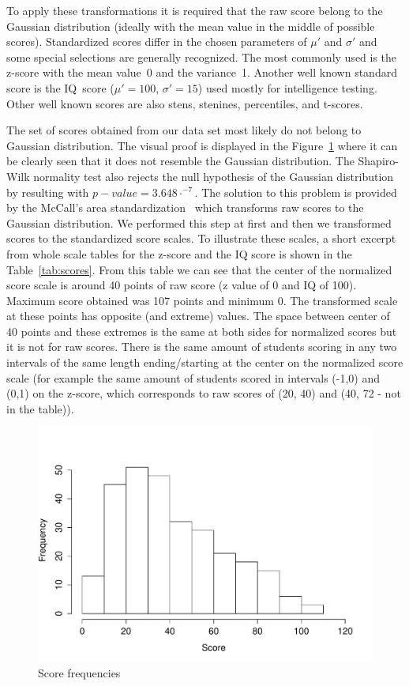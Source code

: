 To apply these transformations it is required that the raw score belong to the Gaussian distribution (ideally with the mean value in the middle of possible scores). Standardized scores differ in the chosen parameters of $\mu'$ and $\sigma'$ and some special selections are generally recognized. The most commonly used is the z-score with the mean value~0 and the variance~1. Another well known standard score is the IQ~score (${\mu' = 100}$, ${\sigma'=15}$) used mostly for intelligence testing. Other well known scores are also stens, stenines, percentiles, and t-scores.

The set of scores obtained from our data set most likely do not belong to Gaussian distribution. The visual proof is displayed in the Figure~\ref{pic:gauss} where it can be clearly seen that it does not resemble the Gaussian distribution. The Shapiro-Wilk normality test also rejects the null hypothesis of the Gaussian distribution by resulting with $p-value = 3.648\cdot^{-7}$. The solution to this problem is provided by the McCall’s area standardization~\cite{McCall2011, 2011psychometrics} which transforms raw scores to the Gaussian distribution. We performed this step at first and then we transformed scores to the standardized score scales. To illustrate these scales, a short excerpt from whole scale tables for the z-score and the IQ score is shown in the Table~\ref{tab:scores}. From this table we can see that the center of the normalized score scale is around 40 points of raw score (z value of 0 and IQ of 100). Maximum score obtained was 107 points and minimum 0. The transformed scale at these points has opposite (and extreme) values. The space between center of 40 points and these extremes is the same at both sides for normalized scores but it is not for raw scores. There is the same amount of students scoring in any two intervals of the same length ending/starting at the center on the normalized score scale (for example the same amount of students scored in intervals (-1,0) and (0,1) on the z-score, which corresponds to raw scores of (20, 40) and (40, 72 - not in the table)).


\begin{figure}%
\begin{center}
\includegraphics[width=0.8\columnwidth]{obr/hist.pdf}%
\caption{Score frequencies}%
\label{pic:gauss}%
\end{center}
\end{figure}



